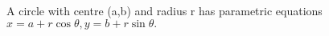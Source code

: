  A circle with centre (a,b) and radius r has
parametric equations $ x=a+ r \cos \theta , y = b+ r \sin \theta . $
